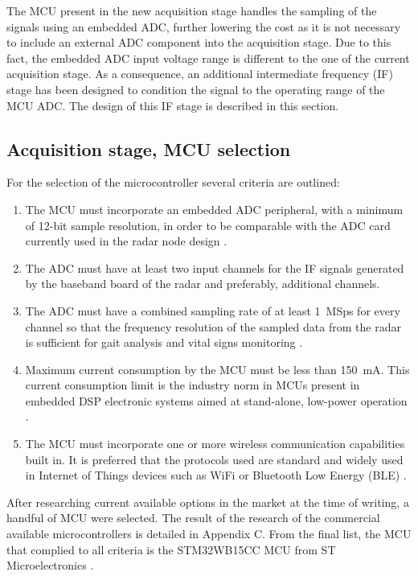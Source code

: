 The MCU present in the new acquisition stage handles the sampling of the signals using an embedded ADC, further lowering the cost as it is not necessary to include an external ADC component into the acquisition stage. Due to this fact, the embedded ADC input voltage range is different to the one of the current acquisition stage. As a consequence, an additional intermediate frequency (IF) stage has been designed to condition the signal to the operating range of the MCU ADC. The design of this IF stage is described in this section.

\subsection{Acquisition stage, MCU selection} \label{sec:mcu_selection}

For the selection of the microcontroller several criteria are outlined:
\begin{enumerate}
	\item The MCU must incorporate an embedded ADC peripheral, with a minimum of 12-bit sample resolution, in order to be comparable with the ADC card currently used in the radar node design \cite{Sardinero2022, ADLINKTechnologies2010}.
	\item The ADC must have at least two input channels for the IF signals generated by the baseband board of the radar and preferably, additional channels.
	\item The ADC must have a combined sampling rate of at least \SI{1}{MSps} for every channel so that the frequency resolution of the sampled data from the radar is sufficient for gait analysis and vital signs monitoring \cite{Antolinos2020, Sardinero2022}.
	\item Maximum current consumption by the MCU must be less than \SI{150}{\milli\ampere}. This current consumption limit is the industry norm in MCUs present in embedded DSP electronic systems aimed at stand-alone, low-power operation \cite{Benini2001}.
	\item The MCU must incorporate one or more wireless communication capabilities built in. It is preferred that the protocols used are standard and widely used in Internet of Things devices such as WiFi or Bluetooth Low Energy (BLE) \cite{AlSarawi2017}.
\end{enumerate}

After researching current available options in the market at the time of writing, a handful of MCU were selected. The result of the research of the commercial available microcontrollers is detailed in Appendix C. %
From the final list, the MCU that complied to all criteria is the STM32WB15CC MCU from ST Microelectronics \cite{STMicroelectronics2022}.

